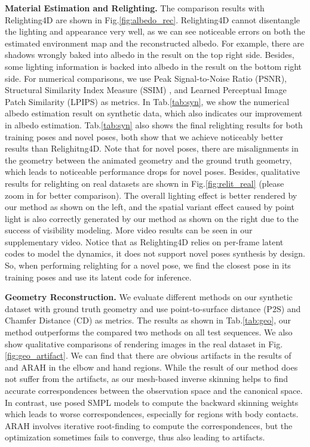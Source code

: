 \textbf{Material Estimation and Relighting.}
The comparison results with Relighting4D \cite{Relighting4D} are shown in Fig.\ref{fig:albedo_rec}.
Relighting4D cannot disentangle the lighting and appearance very well, as we can see noticeable errors on both the estimated environment map and the reconstructed albedo.
For example, there are shadows wrongly baked into albedo in the result on the top right side.
Besides, some lighting information is backed into albedo in the result on the bottom right side.
For numerical comparisons, we use Peak Signal-to-Noise Ratio (PSNR), Structural Similarity Index Measure (SSIM) \cite{ssim}, and Learned Perceptual Image Patch Similarity (LPIPS) \cite{lpips} as metrics.
In Tab.\ref{tab:syn}, we show the numerical albedo estimation result on synthetic data, which also indicates our improvement in albedo estimation.
Tab.\ref{tab:syn} also shows the final relighting results for both training poses and novel poses, both show that we achieve noticeably better results than Relighitng4D.
Note that for novel poses, there are misalignments in the geometry between the animated geometry and the ground truth geometry, which leads to noticeable performance drops for novel poses.
Besides, qualitative results for relighting on real datasets are shown in Fig.\ref{fig:relit_real} (please zoom in for better comparison).
The overall lighting effect is better rendered by our method as shown on the left, and the spatial variant effect caused by point light is also correctly generated by our method as shown on the right due to the success of visibility modeling. More video results can be seen in our supplementary video.
Notice that as Relighting4D relies on per-frame latent codes to model the dynamics, it does not support novel poses synthesis by design. So, when performing relighting for a novel pose, we find the closest pose in its training poses and use its latent code for inference.

\textbf{Geometry Reconstruction.}
We evaluate different methods on our synthetic dataset with ground truth geometry and use point-to-surface distance (P2S) and Chamfer Distance (CD) as metrics.
The results as shown in Tab.\ref{tab:geo}, our method outperforms the compared two methods on all test sequences. 
We also show qualitative comparisons of rendering images in the real dataset in Fig.\ref{fig:geo_artifact}.
We can find that there are obvious artifacts in the results of \citet{peng2022animatable} and ARAH in the elbow and hand regions.
While the result of our method does not suffer from the artifacts, as our mesh-based inverse skinning helps to find accurate correspondences between the observation space and the canonical space.
In contrast, \citet{peng2022animatable} use posed SMPL models to compute the backward skinning weights which leads to worse correspondences, especially for regions with body contacts.
ARAH involves iterative root-finding to compute the correspondences, but the optimization sometimes fails to converge, thus also leading to artifacts.



